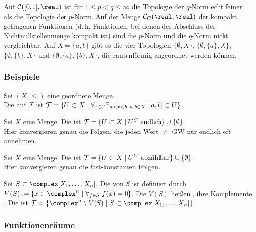 \begin{Bsp}
    Auf $\C([0,1], \real)$ ist für $1 \le p < q \le \infty$ die Topologie der
    $q$-Norm echt feiner als die Topologie der $p$-Norm.
    Auf der Menge $\C_C(\real, \real)$ der kompakt getragenen Funktionen
    (d.\,h. Funktionen, bei denen der Abschluss der Nichtnullstellenmenge
    kompakt ist) sind die $p$-Norm und die $q$-Norm nicht vergleichbar.
    Auf $X = \{a, b\}$ gibt es die vier Topologien
    $\{\emptyset, X\}$, $\{\emptyset, \{a\}, X\}$, $\{\emptyset, \{b\}, X\}$
    und $\{\emptyset, \{a\}, \{b\}, X\}$, die rautenförmig angeordnet
    werden können.
\end{Bsp}

\subsubsection{%
    Beispiele%
}

Sei $(X, \le)$ eine geordnete Menge. \\
Die  auf $X$ ist $\mathcal{T} =
\{U \subset X \;|\; \forall_{x \in U} \exists_{a < x < b,\; a, b \in X}\;
\left]a,b\right[ \subset U\}$.

Sei $X$ eine Menge.
Die  ist
$\mathcal{T} = \{U \subset X \;|\; U^C \text{ endlich}\} \cup
\{\emptyset\}$. \\
Hier konvergieren genau die Folgen, die jeden Wert $\not=$ GW nur endlich oft
annehmen.

Sei $X$ eine Menge.
Die  ist
$\mathcal{T} = \{U \subset X \;|\; U^C \text{ abzählbar}\} \cup
\{\emptyset\}$. \\
Hier konvergieren genau die fast-konstanten Folgen.

Sei $S \subset \complex[X_1, \dotsc, X_n]$.
Die  von $S$ ist definiert durch \\
$V(S) := \{x \in \complex^n \;|\; \forall_{f \in S}\; f(x) = 0\}$.
Die $V(S)$ heißen ,
ihre Komplemente .
Die  ist
$\T = \{\complex^n \setminus V(S) \;|\;
S \subset \complex[X_1, \dotsc, X_n]\}$.

\subsubsection{%
    Funktionenräume%
}

